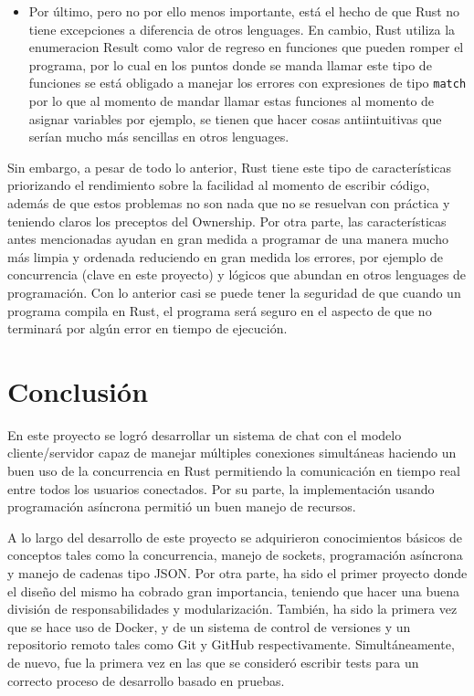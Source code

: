 \documentclass[12pt]{article}
\begin{document}
\begin{itemize}
\item Por último, pero no por ello menos importante, está el hecho de que Rust no tiene excepciones a diferencia de otros lenguages. En cambio, Rust utiliza la enumeracion Result como valor de regreso en funciones que pueden romper el programa, por lo cual en los puntos donde se manda llamar este tipo de funciones se está obligado a manejar los errores con expresiones de tipo \texttt{match} por lo que al momento de mandar llamar estas funciones al momento de asignar variables por ejemplo, se tienen que hacer cosas antiintuitivas que serían mucho más sencillas en otros lenguages.
  
  
\end{itemize}

Sin embargo, a pesar de todo lo anterior, Rust tiene este tipo de características priorizando el rendimiento sobre la facilidad al momento de escribir código, además de que estos problemas no son nada que no se resuelvan con práctica y teniendo claros los preceptos del Ownership. Por otra parte, las características antes mencionadas ayudan en gran medida a programar de una manera mucho más limpia y ordenada reduciendo en gran medida los errores, por ejemplo de concurrencia (clave en este proyecto) y lógicos que abundan en otros lenguages de programación. Con lo anterior casi se puede tener la seguridad de que cuando un programa compila en Rust, el programa será seguro en el aspecto de que no terminará por algún error en tiempo de ejecución.

\section{Conclusión}

En este proyecto se logró desarrollar un sistema de chat con el modelo cliente/servidor capaz de manejar múltiples conexiones simultáneas haciendo un buen uso de la concurrencia en Rust permitiendo la comunicación en tiempo real entre todos los usuarios conectados. Por su parte, la implementación usando programación asíncrona permitió un buen manejo de recursos.

A lo largo del desarrollo de este proyecto se adquirieron conocimientos básicos de conceptos tales como la concurrencia, manejo de sockets, programación asíncrona y manejo de cadenas tipo JSON. Por otra parte, ha sido el primer proyecto donde el diseño del mismo ha cobrado gran importancia, teniendo que hacer una buena división de responsabilidades y modularización. También, ha sido la primera vez que se hace uso de Docker, y de un sistema de control de versiones y un repositorio remoto tales como Git y GitHub respectivamente. Simultáneamente, de nuevo, fue la primera vez en las que se consideró escribir tests para un correcto proceso de desarrollo basado en pruebas.
\end{document}
